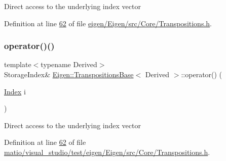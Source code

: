 Direct access to the underlying index vector 

Definition at line \hyperlink{eigen_2_eigen_2src_2_core_2_transpositions_8h_source_l00062}{62} of file \hyperlink{eigen_2_eigen_2src_2_core_2_transpositions_8h_source}{eigen/\+Eigen/src/\+Core/\+Transpositions.\+h}.

\mbox{\label{class_eigen_1_1_transpositions_base_a8b3eb221d9ec1e51a161d276a0020e24}} 
\subsubsection{\texorpdfstring{operator()()}{operator()()}\hspace{0.1cm}{\footnotesize\ttfamily [4/4]}}
{\footnotesize\ttfamily template$<$typename Derived$>$ \\
Storage\+Index\& \hyperlink{class_eigen_1_1_transpositions_base}{Eigen\+::\+Transpositions\+Base}$<$ Derived $>$\+::operator() (\begin{DoxyParamCaption}\item[{\hyperlink{class_eigen_1_1_transpositions_base_a3f5f06118b419e8e6ccbe49ed5b4c91f}{Index}}]{i }\end{DoxyParamCaption})\hspace{0.3cm}{\ttfamily [inline]}}

Direct access to the underlying index vector 

Definition at line \hyperlink{matio_2visual__studio_2test_2eigen_2_eigen_2src_2_core_2_transpositions_8h_source_l00062}{62} of file \hyperlink{matio_2visual__studio_2test_2eigen_2_eigen_2src_2_core_2_transpositions_8h_source}{matio/visual\+\_\+studio/test/eigen/\+Eigen/src/\+Core/\+Transpositions.\+h}.

\mbox{\label{class_eigen_1_1_transpositions_base_a476b5c653c6842e3e4d0104f7f888817}} 
